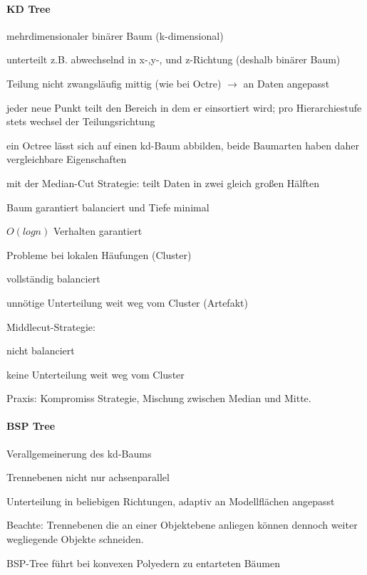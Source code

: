 \documentclass[landscape]{article}
\begin{document}
\begin{multicols}{3}
  \paragraph{KD Tree}
  \begin{itemize*}
    \item mehrdimensionaler binärer Baum (k-dimensional)
    \item unterteilt z.B. abwechselnd in x-,y-, und z-Richtung (deshalb binärer Baum)
    \item Teilung nicht zwangsläufig mittig (wie bei Octre) $\rightarrow$ an Daten angepasst
    \item jeder neue Punkt teilt den Bereich in dem er einsortiert wird; pro Hierarchiestufe stets wechsel der Teilungsrichtung
    \item ein Octree lässt sich auf einen kd-Baum abbilden, beide Baumarten haben daher vergleichbare Eigenschaften
    \item mit der Median-Cut Strategie: teilt Daten in zwei gleich großen Hälften
          \begin{itemize*}
            \item Baum garantiert balanciert und Tiefe minimal
            \item $O(log n)$ Verhalten garantiert
            \item Probleme bei lokalen Häufungen (Cluster)
            \item vollständig balanciert
            \item unnötige Unterteilung weit weg vom Cluster (Artefakt)
          \end{itemize*}
    \item Middlecut-Strategie:
          \begin{itemize*}
            \item nicht balanciert
            \item keine Unterteilung weit weg vom Cluster
          \end{itemize*}
    \item Praxis: Kompromiss Strategie, Mischung zwischen Median und Mitte.
  \end{itemize*}
  
  \paragraph{BSP Tree}
  \begin{itemize*}
    \item Verallgemeinerung des kd-Baums
    \item Trennebenen nicht nur achsenparallel
    \item Unterteilung in beliebigen Richtungen, adaptiv an Modellflächen angepasst
    \item Beachte: Trennebenen die an einer Objektebene anliegen können dennoch weiter wegliegende Objekte schneiden.
    \item BSP-Tree führt bei konvexen Polyedern zu entarteten Bäumen
  \end{itemize*}
  

\end{multicols}
\end{document}
